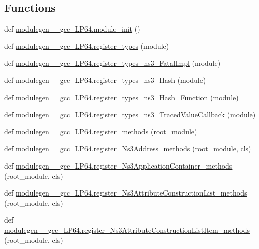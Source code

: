 \subsection*{Functions}
\begin{DoxyCompactItemize}
\item 
def \hyperlink{namespacemodulegen____gcc__LP64_a6fa3bcd89827bb55aea467ffebc10531}{modulegen\+\_\+\+\_\+gcc\+\_\+\+L\+P64.\+module\+\_\+init} ()
\item 
def \hyperlink{namespacemodulegen____gcc__LP64_ab61bb54af74e931fcb41c8f8677a8eb5}{modulegen\+\_\+\+\_\+gcc\+\_\+\+L\+P64.\+register\+\_\+types} (module)
\item 
def \hyperlink{namespacemodulegen____gcc__LP64_a2262e0d4e35e243aa3a1da10a2cb4e41}{modulegen\+\_\+\+\_\+gcc\+\_\+\+L\+P64.\+register\+\_\+types\+\_\+ns3\+\_\+\+Fatal\+Impl} (module)
\item 
def \hyperlink{namespacemodulegen____gcc__LP64_a93555c52620e0de62d76d0946d4554a2}{modulegen\+\_\+\+\_\+gcc\+\_\+\+L\+P64.\+register\+\_\+types\+\_\+ns3\+\_\+\+Hash} (module)
\item 
def \hyperlink{namespacemodulegen____gcc__LP64_a3e77b4168f4d6176242961c3f3cd12f0}{modulegen\+\_\+\+\_\+gcc\+\_\+\+L\+P64.\+register\+\_\+types\+\_\+ns3\+\_\+\+Hash\+\_\+\+Function} (module)
\item 
def \hyperlink{namespacemodulegen____gcc__LP64_a932218c26ce11fb1473ffc3980f37614}{modulegen\+\_\+\+\_\+gcc\+\_\+\+L\+P64.\+register\+\_\+types\+\_\+ns3\+\_\+\+Traced\+Value\+Callback} (module)
\item 
def \hyperlink{namespacemodulegen____gcc__LP64_a8ac8e0786047c1ed08fed9bc1a45843d}{modulegen\+\_\+\+\_\+gcc\+\_\+\+L\+P64.\+register\+\_\+methods} (root\+\_\+module)
\item 
def \hyperlink{namespacemodulegen____gcc__LP64_a0bc87667cfe5a45fc4aa7c0de2ae51d2}{modulegen\+\_\+\+\_\+gcc\+\_\+\+L\+P64.\+register\+\_\+\+Ns3\+Address\+\_\+methods} (root\+\_\+module, cls)
\item 
def \hyperlink{namespacemodulegen____gcc__LP64_a49f97371ad8fe1bb9a7295acd048960a}{modulegen\+\_\+\+\_\+gcc\+\_\+\+L\+P64.\+register\+\_\+\+Ns3\+Application\+Container\+\_\+methods} (root\+\_\+module, cls)
\item 
def \hyperlink{namespacemodulegen____gcc__LP64_a4dea76fc9218ba239313d01e5ac1d4cd}{modulegen\+\_\+\+\_\+gcc\+\_\+\+L\+P64.\+register\+\_\+\+Ns3\+Attribute\+Construction\+List\+\_\+methods} (root\+\_\+module, cls)
\item 
def \hyperlink{namespacemodulegen____gcc__LP64_a897162c4bcad09fae06079f3c1b24777}{modulegen\+\_\+\+\_\+gcc\+\_\+\+L\+P64.\+register\+\_\+\+Ns3\+Attribute\+Construction\+List\+Item\+\_\+methods} (root\+\_\+module, cls)

\end{DoxyCompactItemize}
